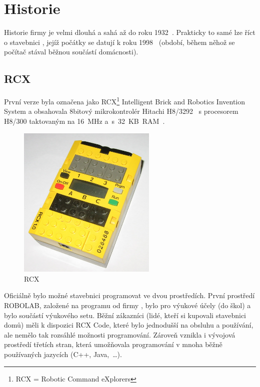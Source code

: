 \chapter{Historie \legoM}

Historie firmy \lego{ }je velmi dlouhá a sahá až do roku 1932~\cite{lego_GroupHistory1930s}. 
Prakticky to samé lze říct o stavebnici \legoM, jejíž počátky se datují k roku 1998~\cite{lego_mindstormsHistory} (období, během něhož se počítač stával běžnou součástí domácnosti).


\section{\legoM{ }RCX}

První verze byla označena jako \legoM{ }RCX\footnote{RCX = Robotic Command eXplorers} Intelligent Brick and Robotics Invention System a  obsahovala 8bitový mikrokontrolér Hitachi H8/3292~\cite{hitachi_microcontrolerH8series} s procesorem H8/300 taktovaným na 16~MHz a~s~32~KB~RAM~\cite{legoMindstormsRCX_Manual}.

\begin{figure}[h]
	\centering
	\includegraphics[width=250px]{images/lego-mindstorms-rcx_wikipedia.jpg}
	\caption[\legoM{ }RCX]{\legoM{ }RCX\protect\footnotemark}
	\label{fig:lego-mindstorms-rcx-wikipedia}
\end{figure}


Oficiálně bylo možné stavebnici programovat ve dvou prostředích. První prostředí ROBOLAB, založené na programu \labview{ }od firmy \NI, bylo pro výukové účely (do škol) a bylo součástí výukového setu. 
Běžní zákazníci (lidé, kteří si kupovali stavebnici domů) měli k dispozici RCX Code, které bylo jednodušší na obsluhu a používání, ale nemělo tak rozsáhlé možnosti programování. 
Zároveň vznikla i vývojová prostředí třetích stran, která umožňovala programování v mnoha běžně používaných jazycích (C++, Java,~\dots).


